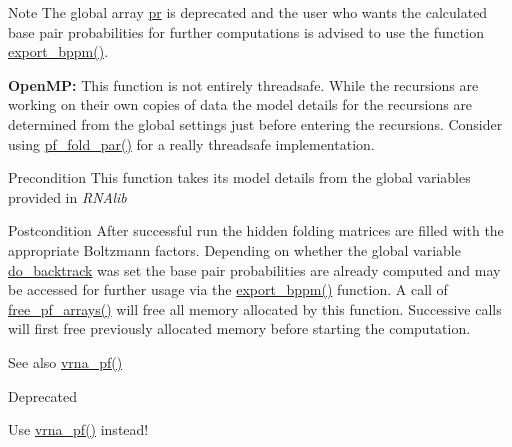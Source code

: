 \begin{DoxyNote}{Note}
The global array \mbox{\hyperlink{fold__vars_8h_ac98ec419070aee6831b44e5c700f090f}{pr}} is deprecated and the user who wants the calculated base pair probabilities for further computations is advised to use the function \mbox{\hyperlink{group__pf__fold_gac5ac7ee281aae1c5cc5898a841178073}{export\+\_\+bppm()}}. 

{\bfseries Open\+MP\+:} This function is not entirely threadsafe. While the recursions are working on their own copies of data the model details for the recursions are determined from the global settings just before entering the recursions. Consider using \mbox{\hyperlink{group__pf__fold_gac4f95bee734b2563a3d6e9932117ebdf}{pf\+\_\+fold\+\_\+par()}} for a really threadsafe implementation. 
\end{DoxyNote}
\begin{DoxyPrecond}{Precondition}
This function takes its model details from the global variables provided in {\itshape R\+N\+Alib} 
\end{DoxyPrecond}
\begin{DoxyPostcond}{Postcondition}
After successful run the hidden folding matrices are filled with the appropriate Boltzmann factors. Depending on whether the global variable \mbox{\hyperlink{group__model__details_gad512b5dd4dbec60faccfe137bb474489}{do\+\_\+backtrack}} was set the base pair probabilities are already computed and may be accessed for further usage via the \mbox{\hyperlink{group__pf__fold_gac5ac7ee281aae1c5cc5898a841178073}{export\+\_\+bppm()}} function. A call of \mbox{\hyperlink{group__pf__fold_gae73db3f49a94f0f72e067ecd12681dbd}{free\+\_\+pf\+\_\+arrays()}} will free all memory allocated by this function. Successive calls will first free previously allocated memory before starting the computation. 
\end{DoxyPostcond}
\begin{DoxySeeAlso}{See also}
\mbox{\hyperlink{group__pf__fold_ga29e256d688ad221b78d37f427e0e99bc}{vrna\+\_\+pf()}} 
\end{DoxySeeAlso}
\begin{DoxyRefDesc}{Deprecated}
\item[\mbox{\hyperlink{deprecated__deprecated000104}{Deprecated}}]Use \mbox{\hyperlink{group__pf__fold_ga29e256d688ad221b78d37f427e0e99bc}{vrna\+\_\+pf()}} instead! \end{DoxyRefDesc}

